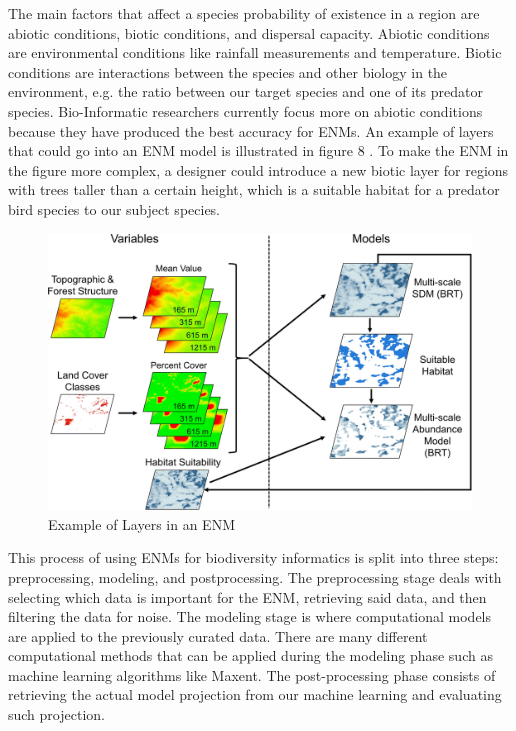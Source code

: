 \documentclass[12pt,journal,compsoc]{IEEEtran}
\begin{document}
The main factors that affect a species probability of existence in a region are abiotic conditions, biotic conditions, and dispersal capacity. Abiotic conditions are environmental conditions like rainfall measurements and temperature. Biotic conditions are interactions between the species and other biology in the environment, e.g. the ratio between our target species and one of its predator species. Bio-Informatic researchers currently focus more on abiotic conditions because they have produced the best accuracy for ENMs. \cite{ctx28867828220006531}
An example of layers that could go into an ENM model is illustrated in figure 8 \cite{hallman_robinson_2020}. To make the ENM in the figure more complex, a designer could introduce a new biotic layer for regions with trees taller than a certain height, which is a suitable habitat for a predator bird species to our subject species.

\begin{figure}[H]
    \centering
    \includegraphics[width=\linewidth]{images/10980_2020_1007_Fig1_HTML.png}
    \caption{Example of Layers in an ENM}
    \label{fig:Example of Layers in an ENM}
\end{figure}

This process of using ENMs for biodiversity informatics is split into three steps: preprocessing, modeling, and postprocessing. The preprocessing stage deals with selecting which data is important for the ENM, retrieving said data, and then filtering the data for noise. The modeling stage is where computational models are applied to the previously curated data. There are many different computational methods that can be applied during the modeling phase such as machine learning algorithms like Maxent. The post-processing phase consists of retrieving the actual model projection from our machine learning and evaluating such projection.
\end{document}
